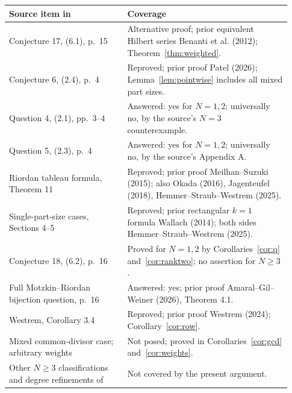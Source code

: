 \documentclass[11pt]{article}
\begin{document}
\begin{center}
\small
\begin{tabular}{@{}>{\raggedright\arraybackslash}p{0.39\linewidth}>{\raggedright\arraybackslash}p{0.54\linewidth}@{}}
\toprule
Source item in~\cite{HSW} & Coverage\\
\midrule
Conjecture 17, (6.1), p.~15 & Alternative proof; prior equivalent Hilbert series Benanti et al. (2012); Theorem~\ref{thm:weighted}.\\
Conjecture 6, (2.4), p.~4 & Reproved; prior proof Patel (2026); Lemma~\ref{lem:pointwise} includes all mixed part sizes.\\
Question 4, (2.1), pp.~3--4 & Answered: yes for $N=1,2$; universally no, by the source's $N=3$ counterexample.\\
Question 5, (2.3), p.~4 & Answered: yes for $N=1,2$; universally no, by the source's Appendix A.\\
Riordan tableau formula, Theorem 11 & Reproved; prior proof Meilhan--Suzuki (2015); also Okada (2016), Jagenteufel (2018), Hemmer--Straub--Westrem (2025).\\
Single-part-size cases, Sections 4--5 & Reproved; prior rectangular $k=1$ formula Wallach (2014); both sides Hemmer--Straub--Westrem (2025).\\
Conjecture 18, (6.2), p.~16 & Proved for $N=1,2$ by Corollaries~\ref{cor:q} and~\ref{cor:ranktwo}; no assertion for $N\geq3$.\\
Full Motzkin--Riordan bijection question, p.~16 & Answered: yes; prior proof Amaral--Gil--Weiner (2026), Theorem 4.1.\\
Westrem, Corollary 3.4 & Reproved; prior proof Westrem (2024); Corollary~\ref{cor:row}.\\
Mixed common-divisor case; arbitrary weights & Not posed; proved in Corollaries~\ref{cor:gcd} and~\ref{cor:weights}.\\
Other $N\geq3$ classifications and degree refinements of~\cite{K} & Not covered by the present argument.\\
\bottomrule
\end{tabular}
\end{center}
\end{document}
